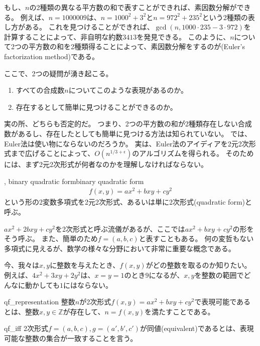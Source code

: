 もし、$n$の2種類の異なる平方数の和で表すことができれば、素因数分解ができる。
例えば、$n=1000009$は、$n=1000^2+3^2$と$n=972^2+235^2$という2種類の表し方がある。
これを見つけることができれば、$\gcd(n, 1000\cdot235 - 3\cdot972)$を計算することによって、非自明な約数$3413$を発見できる。
このように、$n$について2つの平方数の和を2種類得ることによって、素因数分解をするのが(Euler's factorization method)である。

ここで、2つの疑問が湧き起こる。
\begin{enumerate}
\item すべての合成数$n$についてこのような表現があるのか。
\item 存在するとして簡単に見つけることができるのか。
\end{enumerate}
実の所、どちらも否定的だ。
つまり、2つの平方数の和が2種類存在しない合成数があるし、存在したとしても簡単に見つける方法は知られていない。
では、Euler法は使い物にならないのだろうか。
実は、Euler法のアイディアを2元2次形式まで広げることによって、$O(n^{1/3+\epsilon})$のアルゴリズムを得られる。
そのためには、まず2元2次形式が何者なのかを理解しなければならない。

\begin{Defi}{, binary quadratic form}{binary quadratic form}
\begin{align*}
f(x,y) = ax^2 + bxy + cy^2
\end{align*}
という形の2変数多項式を2元2次形式、あるいは単に2次形式(quadratic form)と呼ぶ。
\end{Defi}

$ax^2 + 2bxy + cy^2$を2次形式と呼ぶ流儀があるが、ここでは$ax^2 + bxy + cy^2$の形をそう呼ぶ。
また、簡単のため$f=(a,b,c)$と表すこともある。
何の変哲もない多項式に見えるが、数学の様々な分野において非常に重要な概念である。

今、我々は$x,y$に整数を与えたとき、$f(x,y)$がどの整数を取るのか知りたい。
例えば、$4x^2+3xy+2y^2$は、$x=y=1$のとき$9$になるが、$x,y$を整数の範囲でどんなに動かしても$1$にはならない。

\begin{Defi}{}{qf_representation}
整数$n$が2次形式$f(x,y)=ax^2+bxy+cy^2$で表現可能であるとは、整数$x,y\in\mathbb{Z}$が存在して、$n=f(x,y)$を満たすことである。
\end{Defi}

\begin{Defi}{}{qf_iff}
2次形式$f=(a,b,c),g=(a',b',c')$が同値(equivalent)であるとは、表現可能な整数の集合が一致することを言う。
\end{Defi}

